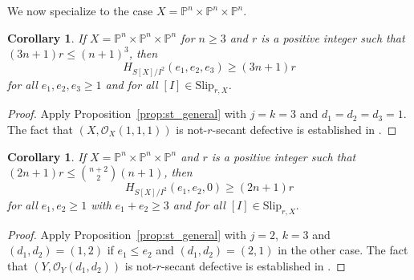 \documentclass[12pt]{amsart}
\newtheorem{corollary}[theorem]{Corollary}
\theoremstyle{definition}
\theoremstyle{remark}
\theoremstyle{definition}
\newcommand{\HF}[2]{H_{#1}(#2)}
\newcommand{\Slip}[2]{\mathrm{Slip}_{#1,#2}}
\newcommand{\OO}{\mathcal{O}}
\newcommand{\PP}{\mathbb{P}}
\begin{document}
We now specialize to the case $X=\PP^n\times \PP^n\times \PP^n$.


\begin{corollary}\label{c:211test}
    If $X=\PP^n\times \PP^n\times\PP^n$ for $n\geq 3$ and $r$ is a positive integer such that $(3n+1)r \leq (n+1)^3$, then 
    \begin{equation}
    \HF{S[X]/I^2}{e_1,e_2,e_3} \geq (3n+1)r    
    \end{equation}
	for all $e_1,e_2,e_3\ge 1$ and for all $[I]\in \Slip{r}{X}$.
\end{corollary}
\begin{proof}
Apply Proposition~\ref{prop:st_general} with $j=k=3$ and $d_1 = d_2 = d_3 = 1$. The fact that $(X, \OO_X(1,1,1))$ is not-$r$-secant defective is established in \cite[Theorem~4.4]{Lic85}.
\end{proof}


\begin{corollary}\label{c:220test}
    If $X=\PP^n\times \PP^n\times \PP^n$ and $r$ is a positive integer such that $(2n+1)r \leq \binom{n+2}{2}(n+1)$, then 
    \begin{equation}
    \HF{S[X]/I^2}{e_1,e_2,0} \geq (2n+1)r    
    \end{equation}
    for all $e_1,e_2\ge 1$ with $e_1 + e_2 \ge 3$ and for all $[I]\in \Slip{r}{X}.$
\end{corollary}
\begin{proof}
    Apply Proposition~\ref{prop:st_general} with $j=2$, $k=3$ and $(d_1,d_2) = (1,2)$ if $e_1\leq e_2$ and $(d_1,d_2)=(2,1)$ in the other case. The fact that $(Y, \OO_Y(d_1,d_2))$ is not-$r$-secant defective is established in \cite[Theorem~1.2]{Abo10}.
\end{proof}
\end{document}
